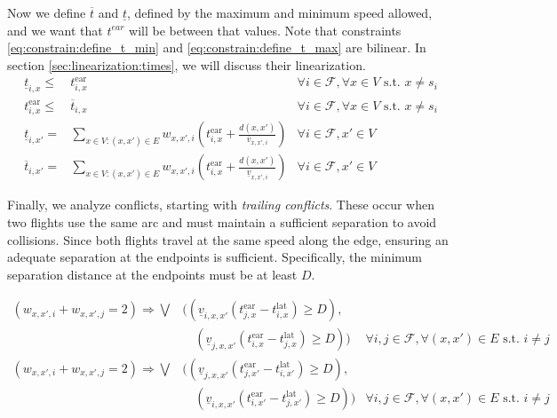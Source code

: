 \documentclass[../../thesis.tex]{subfiles}
\begin{document}
Now we define $\overline t$ and $\underline t$, defined by the maximum and minimum speed allowed, and we want that $t^{ear}$ will be between that values.
Note that constraints \eqref{eq:constrain:define_t_min} and \eqref{eq:constrain:define_t_max} are bilinear. In section \ref{sec:linearization:times}, we will discuss their linearization.
\begin{align}\label{eq:constrain:defineSpeedBound}
    \underline t_{i,x} \leq& t^\text{ear}_{i,x}
    &\forall i \in \mathcal F, \forall x\in V\text{ s.t. } x\neq s_i\\
    t^\text{ear}_{i,x} \leq& \overline t_{i,x}
    &\forall i\in \mathcal F,\forall x\in V\text{ s.t. } x\neq s_i\\
    \underline t_{i,x'}=&\sum_{x\in V: (x,x')\in E} w_{x,x',i}\left(t^\text{ear}_{i,x}+\frac{d(x,x')}{\overline v_{x,x',i}}\right) &\forall i\in \mathcal F, x'\in V
    \label{eq:constrain:define_t_min}\\
    \overline t_{i,x'}=&\sum_{x\in V: (x,x')\in E} w_{x,x',i}\left(t^\text{ear}_{i,x}+\frac{d(x,x')}{\underline v_{x,x',i}}\right) &\forall i \in\mathcal F, x'\in V\label{eq:constrain:define_t_max}
\end{align}

Finally, we analyze conflicts, starting with \textit{trailing conflicts}. These occur when two flights use the same arc and must maintain a sufficient separation to avoid collisions. Since both flights travel at the same speed along the edge, ensuring an adequate separation at the endpoints is sufficient. Specifically, the minimum separation distance at the endpoints must be at least \( D \).

\begin{align}
    (w_{x,x',i} + w_{x,x',j} = 2) \Rightarrow \bigvee&\Bigg(
    (\underline v_{i,x,x'}(t^\text{ear}_{j,x}-t^\text{lat}_{i,x})\geq D), \nonumber \\ 
    &\quad (\underline v_{j,x,x'}(t^\text{ear}_{i,x}-t^\text{lat}_{j,x})\geq D)\Bigg) 
    & \forall i,j \in \mathcal{F}, \forall(x,x') \in E \text{ s.t. } i\neq j\\
    (w_{x,x',i} + w_{x,x',j} = 2) \Rightarrow\bigvee&\Bigg(
    (\underline v_{j,x,x'}(t^\text{ear}_{j,x'}-t^\text{lat}_{i,x'})\geq D), \nonumber\\
    &\quad (\underline v_{i,x,x'}(t^\text{ear}_{i,x'}-t^\text{lat}_{j,x'})\geq D)\Bigg)
    & \forall i,j \in \mathcal{F},\forall(x,x')\in E \text{ s.t. } i\neq j
\end{align}
\end{document}
